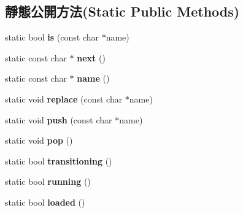 \subsection*{靜態公開方法(Static Public Methods)}
\begin{DoxyCompactItemize}
\item 
static bool {\bfseries is} (const char $\ast$name)\hypertarget{class_i_dream_sky_1_1_scene_abba8220ceeba7f7c538d41790fdba5a2}{}\label{class_i_dream_sky_1_1_scene_abba8220ceeba7f7c538d41790fdba5a2}

\item 
static const char $\ast$ {\bfseries next} ()\hypertarget{class_i_dream_sky_1_1_scene_aa17bd125efa10de89ebc2347671266f4}{}\label{class_i_dream_sky_1_1_scene_aa17bd125efa10de89ebc2347671266f4}

\item 
static const char $\ast$ {\bfseries name} ()\hypertarget{class_i_dream_sky_1_1_scene_a975521adb8286d36f13e057be12fc82c}{}\label{class_i_dream_sky_1_1_scene_a975521adb8286d36f13e057be12fc82c}

\item 
static void {\bfseries replace} (const char $\ast$name)\hypertarget{class_i_dream_sky_1_1_scene_ae6b7b8cd99aa33cbad31ff89e72f537a}{}\label{class_i_dream_sky_1_1_scene_ae6b7b8cd99aa33cbad31ff89e72f537a}

\item 
static void {\bfseries push} (const char $\ast$name)\hypertarget{class_i_dream_sky_1_1_scene_a5e2ae344f586c3337b145f835f7f03fd}{}\label{class_i_dream_sky_1_1_scene_a5e2ae344f586c3337b145f835f7f03fd}

\item 
static void {\bfseries pop} ()\hypertarget{class_i_dream_sky_1_1_scene_addd665437e439f7dba0fa3eadbd1aab4}{}\label{class_i_dream_sky_1_1_scene_addd665437e439f7dba0fa3eadbd1aab4}

\item 
static bool {\bfseries transitioning} ()\hypertarget{class_i_dream_sky_1_1_scene_a75d802e3bb17fe1d3323a296e0b4ef2f}{}\label{class_i_dream_sky_1_1_scene_a75d802e3bb17fe1d3323a296e0b4ef2f}

\item 
static bool {\bfseries running} ()\hypertarget{class_i_dream_sky_1_1_scene_a3ad03236a6b2d2b5257b57f9d94eb849}{}\label{class_i_dream_sky_1_1_scene_a3ad03236a6b2d2b5257b57f9d94eb849}

\item 
static bool {\bfseries loaded} ()\hypertarget{class_i_dream_sky_1_1_scene_add6836105b3b0846010632b831b3114a}{}\label{class_i_dream_sky_1_1_scene_add6836105b3b0846010632b831b3114a}

\end{DoxyCompactItemize}
